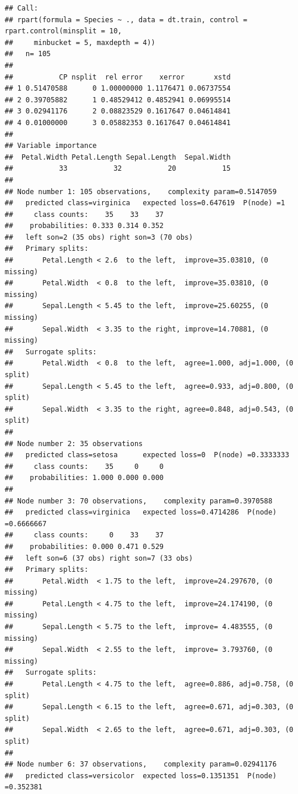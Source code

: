 \documentclass[
]{book}
\theoremstyle{plain}
\theoremstyle{definition}
\theoremstyle{definition}
\theoremstyle{definition}
\theoremstyle{definition}
\theoremstyle{definition}
\theoremstyle{remark}
\begin{document}
\begin{verbatim}
## Call:
## rpart(formula = Species ~ ., data = dt.train, control = rpart.control(minsplit = 10, 
##     minbucket = 5, maxdepth = 4))
##   n= 105 
## 
##           CP nsplit  rel error    xerror       xstd
## 1 0.51470588      0 1.00000000 1.1176471 0.06737554
## 2 0.39705882      1 0.48529412 0.4852941 0.06995514
## 3 0.02941176      2 0.08823529 0.1617647 0.04614841
## 4 0.01000000      3 0.05882353 0.1617647 0.04614841
## 
## Variable importance
##  Petal.Width Petal.Length Sepal.Length  Sepal.Width 
##           33           32           20           15 
## 
## Node number 1: 105 observations,    complexity param=0.5147059
##   predicted class=virginica   expected loss=0.647619  P(node) =1
##     class counts:    35    33    37
##    probabilities: 0.333 0.314 0.352 
##   left son=2 (35 obs) right son=3 (70 obs)
##   Primary splits:
##       Petal.Length < 2.6  to the left,  improve=35.03810, (0 missing)
##       Petal.Width  < 0.8  to the left,  improve=35.03810, (0 missing)
##       Sepal.Length < 5.45 to the left,  improve=25.60255, (0 missing)
##       Sepal.Width  < 3.35 to the right, improve=14.70881, (0 missing)
##   Surrogate splits:
##       Petal.Width  < 0.8  to the left,  agree=1.000, adj=1.000, (0 split)
##       Sepal.Length < 5.45 to the left,  agree=0.933, adj=0.800, (0 split)
##       Sepal.Width  < 3.35 to the right, agree=0.848, adj=0.543, (0 split)
## 
## Node number 2: 35 observations
##   predicted class=setosa      expected loss=0  P(node) =0.3333333
##     class counts:    35     0     0
##    probabilities: 1.000 0.000 0.000 
## 
## Node number 3: 70 observations,    complexity param=0.3970588
##   predicted class=virginica   expected loss=0.4714286  P(node) =0.6666667
##     class counts:     0    33    37
##    probabilities: 0.000 0.471 0.529 
##   left son=6 (37 obs) right son=7 (33 obs)
##   Primary splits:
##       Petal.Width  < 1.75 to the left,  improve=24.297670, (0 missing)
##       Petal.Length < 4.75 to the left,  improve=24.174190, (0 missing)
##       Sepal.Length < 5.75 to the left,  improve= 4.483555, (0 missing)
##       Sepal.Width  < 2.55 to the left,  improve= 3.793760, (0 missing)
##   Surrogate splits:
##       Petal.Length < 4.75 to the left,  agree=0.886, adj=0.758, (0 split)
##       Sepal.Length < 6.15 to the left,  agree=0.671, adj=0.303, (0 split)
##       Sepal.Width  < 2.65 to the left,  agree=0.671, adj=0.303, (0 split)
## 
## Node number 6: 37 observations,    complexity param=0.02941176
##   predicted class=versicolor  expected loss=0.1351351  P(node) =0.352381

\end{verbatim}
\end{document}

